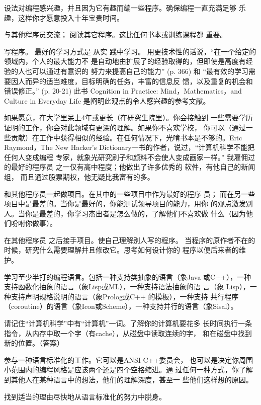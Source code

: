 \begin{compactitem}
\item 设法对编程感兴趣，并且因为它有趣而编一些程序。确保编程一直充满足够 乐趣，这样你才愿意投入十年宝贵时间。
\item 与其他程序员交流； 阅读其它程序。这比任何书本或训练课程都 重要。
\item 写程序。 最好的学习方式是 从实 践中学习。 用更技术性的话说，“在一个给定的领域内，个人的最大能力不 是自动地由扩展了的经验取得的，但即使是高度有经验的人也可以通过有意识的 努力来提高自己的能力” (p. 366) 和 “最有效的学习需要因人而异的适当难度，目标明确的任务，丰富的信息反 馈，以及重复的机会和错误修正。” (p. 20-21) 此书 Cognition in Practice: Mind，Mathematics，and Culture in Everyday Life 是阐明此观点的令人感兴趣的参考文献。
\item 如果愿意，在大学里呆上4年或更长（在研究生院里）。你会接触到 一些需要学历证明的工作，你会对此领域有更深的理解。如果你不喜欢学校， 你可以（通过一 些贡献）在工作中获得相似的经验。在任何情况下，光啃书本是不够的。Eric Raymond，The New Hacker's Dictionary一书的作者，说过，“计算机科学不能把任何人变成编程 专家，就象光研究刷子和颜料不会使人变成画家一样。” 我雇佣过的最好的程序员 之一仅有高中程度；他做出了许多优秀的 软件，有他自己的新闻组， 而且通过股票期权，他无疑比我富有的多。
\item 和其他程序员一起做项目。在其中的一些项目中作为最好的程序 员； 而在另一些项目中是最差的。当你是最好的，你能测试领导项目的能力，用你 的观点激发别人。当你是最差的，你学习杰出者是怎么做的，了解他们不喜欢做 什么（因为他们吩咐你做事）。
\item 在其他程序员 之后接手项目。使自己理解别人写的程序。 当程序的原作者不在的时候，研究什么需要理解并且修改它。思考如何设计你的 程序以便后来者的维护。
\item 学习至少半打的编程语言。包括一种支持类抽象的语言（象Java 或C++），一种支持函数化抽象的语言（象Lisp或ML），一种支持语法抽象的语 言（象 Lisp），一种支持声明规格说明的语言（象Prolog或C++ 的模板），一种支持 共行程序（coroutine）的语言（象Icon或Scheme），一种支持并行的语言（象Sisal）。
\item 请记住“计算机科学”中有“计算机”一词。了解你的计算机要花多 长时间执行一条指令，从内存中取一个字（有cache），从磁盘中读取连续的字， 和在磁盘中找到新的位置。（答案）
\item 参与一种语言标准化的工作。它可以是ANSI C++委员会， 也可以是决定你周围小范围内的编程风格是应该两个还是四个空格缩进。通 过任何一种方式，你了解到其他人在某种语言中的想法，他们的理解深度，甚至一 些他们这样想的原因。
\item 找到适当的理由尽快地从语言标准化的努力中脱身。

\end{compactitem}

